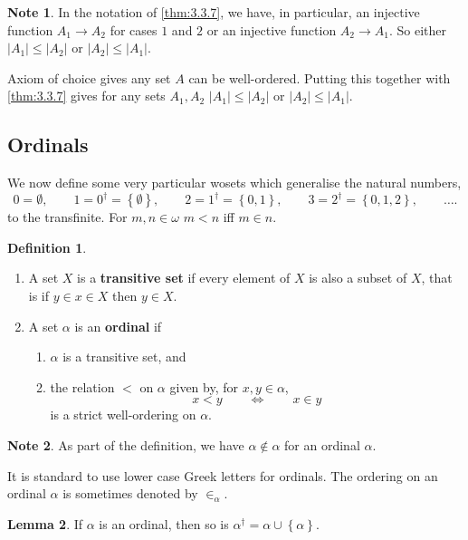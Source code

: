 \documentclass{article}
\newcommand{\cb}[1]{\left\{ #1 \right\}}
\newcommand{\abs}[1]{\left\lvert #1 \right\rvert}
\theoremstyle{definition}\newtheorem{definition}{Definition}[subsection]
\theoremstyle{definition}\newtheorem{remark}[definition]{Remark}
\theoremstyle{definition}\newtheorem*{example}{Example}
\theoremstyle{definition}\newtheorem*{note}{Note}
\newtheorem{lemma}[definition]{Lemma}
\begin{document}
\begin{note}
In the notation of \ref{thm:3.3.7}, we have, in particular, an injective function $ A_1 \to A_2 $ for cases $ 1 $ and $ 2 $ or an injective function $ A_2 \to A_1 $. So either $ \abs{A_1} \le \abs{A_2} $ or $ \abs{A_2} \le \abs{A_1} $.
\end{note}

Axiom of choice gives any set $ A $ can be well-ordered. Putting this together with \ref{thm:3.3.7} gives for any sets $ A_1, A_2 $ $ \abs{A_1} \le \abs{A_2} $ or $ \abs{A_2} \le \abs{A_1} $.

\subsection{Ordinals}

We now define some very particular wosets which generalise the natural
numbers,
$$ 0 = \emptyset, \qquad 1 = 0^\dagger = \cb{\emptyset}, \qquad 2 = 1^\dagger = \cb{0, 1}, \qquad 3 = 2^\dagger = \cb{0, 1, 2}, \qquad \dots. $$
to the transfinite. For $ m, n \in \omega $ $ m < n $ iff $ m \in n $.


\begin{definition}
\hfill
\begin{enumerate}
\item A set $ X $ is a \textbf{transitive set} if every element of $ X $ is also a subset of $ X $, that is if $ y \in x \in X $ then $ y \in X $.
\item A set $ \alpha $ is an \textbf{ordinal} if
\begin{enumerate}
\item $ \alpha $ is a transitive set, and
\item the relation $ < $ on $ \alpha $ given by, for $ x, y \in \alpha $,
$$ x < y \qquad \iff \qquad x \in y $$
is a strict well-ordering on $ \alpha $.
\end{enumerate}
\end{enumerate}
\end{definition}

\begin{note}
As part of the definition, we have $ \alpha \notin \alpha $ for an ordinal $ \alpha $.
\end{note}

It is standard to use lower case Greek letters for ordinals. The ordering on an ordinal $ \alpha $ is sometimes denoted by $ \in_\alpha $.

\begin{lemma}
\label{lem:3.4.2}
If $ \alpha $ is an ordinal, then so is $ \alpha^\dagger = \alpha \cup \cb{\alpha} $.
\end{lemma}
\end{document}

